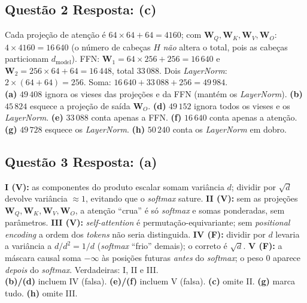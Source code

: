 \documentclass[11pt,a4paper]{article}
\begin{document}
\subsection*{Questão 2 \textemdash{} Resposta: (c)}
Cada projeção de atenção é $64\times 64 + 64 = 4160$; com $\mathbf{W}_Q, \mathbf{W}_K, \mathbf{W}_V, \mathbf{W}_O$: $4 \times 4160 = 16\,640$ (o número de cabeças $H$ \emph{não} altera o total, pois as cabeças particionam $d_{\text{model}}$). FFN: $\mathbf{W}_1 = 64\times 256 + 256 = 16\,640$ e $\mathbf{W}_2 = 256\times 64 + 64 = 16\,448$, total $33\,088$. Dois \textit{LayerNorm}: $2 \times (64 + 64) = 256$. Soma: $16\,640 + 33\,088 + 256 = 49\,984$.\\
\textbf{(a)} $49\,408$ ignora os vieses das projeções e da FFN (mantém os \textit{LayerNorm}).
\textbf{(b)} $45\,824$ esquece a projeção de saída $\mathbf{W}_O$.
\textbf{(d)} $49\,152$ ignora todos os vieses e os \textit{LayerNorm}.
\textbf{(e)} $33\,088$ conta apenas a FFN.
\textbf{(f)} $16\,640$ conta apenas a atenção.
\textbf{(g)} $49\,728$ esquece os \textit{LayerNorm}.
\textbf{(h)} $50\,240$ conta os \textit{LayerNorm} em dobro.

\subsection*{Questão 3 \textemdash{} Resposta: (a)}
\textbf{I (V):} as componentes do produto escalar somam variância $d$; dividir por $\sqrt{d}$ devolve variância $\approx 1$, evitando que o \textit{softmax} sature.
\textbf{II (V):} sem as projeções $\mathbf{W}_Q, \mathbf{W}_K, \mathbf{W}_V, \mathbf{W}_O$, a atenção ``crua'' é só \textit{softmax} e somas ponderadas, sem parâmetros.
\textbf{III (V):} \textit{self-attention} é permutação-equivariante; sem \textit{positional encoding} a ordem dos \textit{tokens} não seria distinguida.
\textbf{IV (F):} dividir por $d$ levaria a variância a $d/d^2 = 1/d$ (\textit{softmax} ``frio'' demais); o correto é $\sqrt{d}$.
\textbf{V (F):} a máscara causal soma $-\infty$ às posições futuras \emph{antes} do \textit{softmax}; o peso $0$ aparece \emph{depois} do \textit{softmax}.
Verdadeiras: I, II e III.\\
\textbf{(b)/(d)} incluem IV (falsa).
\textbf{(e)/(f)} incluem V (falsa).
\textbf{(c)} omite II.
\textbf{(g)} marca tudo.
\textbf{(h)} omite III.
\end{document}
